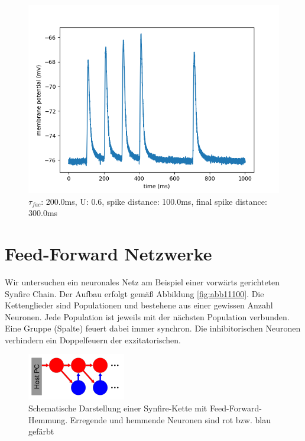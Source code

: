 \documentclass[10pt,a4paper]{scrartcl}
\begin{document}
\begin{figure} [ht]
\begin{center}
\label{fig:abb30}
\caption{$\tau_{fac}$: 200.0ms, U: 0.6, spike distance: 100.0ms, final spike distance: 300.0ms}
\includegraphics[scale=0.35]{pictures/final_spike_variation_20.pdf} 
\end{center}
\end{figure}


\newpage


\section{Feed-Forward Netzwerke}
Wir untersuchen ein neuronales Netz am Beispiel einer vorwärts gerichteten Synfire Chain. Der Aufbau erfolgt gemäß Abbildung \ref{fig:abb11100}. Die Kettenglieder sind Populationen und bestehene aus einer gewissen Anzahl Neuronen. Jede Population ist jeweils mit der nächsten Population verbunden. Eine Gruppe (Spalte) feuert dabei immer synchron. Die inhibitorischen Neuronen verhindern ein Doppelfeuern der exzitatorischen. 

\begin{figure} [ht]
\begin{center}
\label{fig:abb4}
\caption{Schematische Darstellung einer Synfire-Kette mit Feed-Forward-Hemmung. Erregende und hemmende Neuronen sind rot bzw. blau gefärbt}
\includegraphics[scale=0.8]{pictures/synfire_chain.png}
\end{center}
\end{figure}
\end{document}

